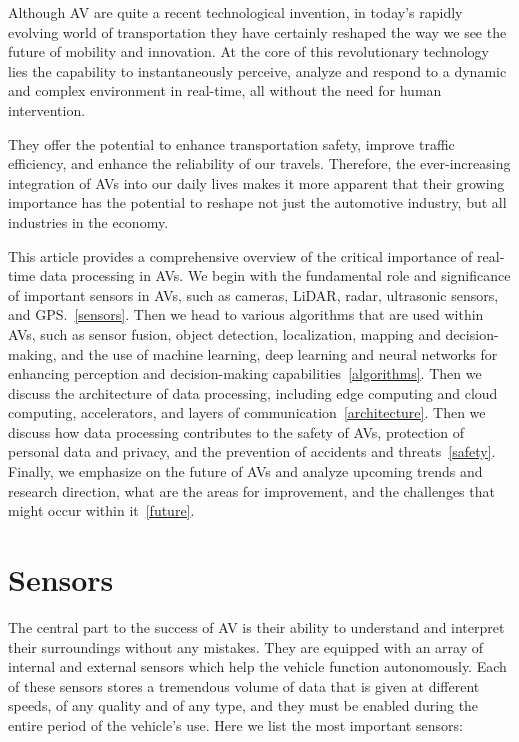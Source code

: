 \documentclass[10pt,oneside,english,a4paper]{article}
\begin{document}
\indent Although AV are quite a recent technological invention, in today's rapidly evolving world of transportation they have certainly reshaped the way we see the future of mobility and innovation. At the core of this revolutionary technology lies the capability to instantaneously perceive, analyze and respond to a dynamic and complex environment in real-time, all without the need for human intervention. 
\par They offer the potential to enhance transportation safety, improve traffic efficiency, and enhance the reliability of our travels. Therefore, the ever-increasing integration of AVs into our daily lives makes it more apparent that their growing importance has the potential to reshape not just the automotive industry, but all industries in the economy. 
\par This article provides a comprehensive overview of the critical importance of real-time data processing in AVs. We begin with the fundamental role and significance of important sensors in AVs, such as cameras, LiDAR, radar, ultrasonic sensors, and GPS.~\eqref{sensors}. 
Then we head to various algorithms that are used within AVs, such as sensor fusion, object detection, localization, mapping and decision-making, and the use of machine learning, deep learning and neural networks for enhancing perception and decision-making capabilities~\eqref{algorithms}. Then we discuss the architecture of data processing, including edge computing and cloud computing, accelerators, and layers of communication~\eqref{architecture}. Then we discuss how data processing contributes to the safety of AVs, protection of personal data and privacy, and the prevention of accidents and threats~\eqref{safety}. Finally, we emphasize on the future of AVs and analyze upcoming trends and research direction, what are the areas for improvement, and the challenges that might occur within it~\eqref{future}.


\section{Sensors} \label{sensors}


\indent The central part to the success of AV is their ability to understand and interpret their surroundings without any mistakes. They are equipped with an array of internal and external sensors which help the vehicle function autonomously. Each of these sensors stores a tremendous volume of data that is given at different speeds, of any quality and of any type, and they must be enabled during the entire period of the vehicle's use. Here we list the most important sensors:
\end{document}
